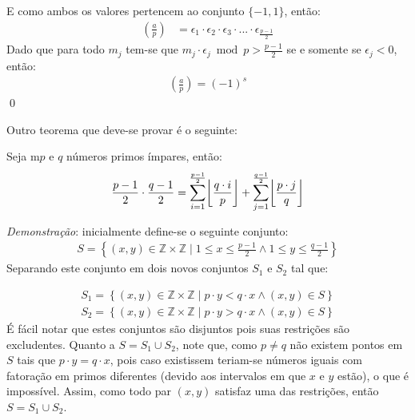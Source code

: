 E como ambos os valores pertencem ao conjunto $\{-1, 1\}$, então:
\begin{align*}
    \left(\frac{a}{p}\right) & = \epsilon_1 \cdot \epsilon_2 \cdot \epsilon_3 \cdot ... \cdot \epsilon_{\frac{p-1}{2}}
\end{align*}
Dado que para todo $m_j$ tem-se que $m_j \cdot \epsilon_j \bmod{p} > \frac{p-1}{2}$ se e somente se $\epsilon_j < 0$, então:
\begin{align*}
    \left(\frac{a}{p}\right) = (-1)^s
\end{align*} \qed

\DeclarePairedDelimiter\ceil{\lceil}{\rceil}
\DeclarePairedDelimiter\floor{\lfloor}{\rfloor}

Outro teorema que deve-se provar é o seguinte:
\begin{teorema} \label{teorema:somatorio-grafico}Seja m$p$ e $q$ números primos ímpares, então:
    \begin{equation} \label{eq:pointsnum}
    \frac{p-1}{2} \cdot \frac{q-1}{2} = \sum_{i = 1}^{\frac{p-1}{2}} \floor*{\frac{q \cdot i}{p}} + \sum_{j = 1}^{\frac{q-1}{2}} \floor*{\frac{p \cdot j}{q}}
    \end{equation}
\end{teorema}

\noindent
\textit{Demonstração}: inicialmente define-se o seguinte conjunto:
\begin{align*}
    S = \left\{ (x, y) \in \mathbb{Z} \times \mathbb{Z} \;\bigg|\; 1 \leq x \leq \frac{p-1}{2} \land 1 \leq y \leq \frac{q-1}{2} \right\}
\end{align*}
Separando este conjunto em dois novos conjuntos $S_1$ e $S_2$ tal que:

\begin{align*}
    S_1 = \left\{ (x, y) \in \mathbb{Z} \times \mathbb{Z} \;\big|\; p \cdot y < q \cdot x \land (x,y) \in S\right\}
    \\
    S_2 = \left\{ (x, y) \in \mathbb{Z} \times \mathbb{Z} \;\big|\; p \cdot y > q \cdot x \land (x,y) \in S\right\}
\end{align*}
É fácil notar que estes conjuntos são disjuntos pois suas restrições são excludentes. Quanto a $S = S_1 \cup S_2$, note que, como $p \neq q$ não existem pontos em $S$ tais que $p \cdot y = q \cdot x$, pois caso existissem teriam-se números iguais com fatoração em primos diferentes (devido aos intervalos em que $x$ e $y$ estão), o que é impossível. Assim, como todo par $(x, y)$ satisfaz uma das restrições, então $S = S_1 \cup S_2$.

